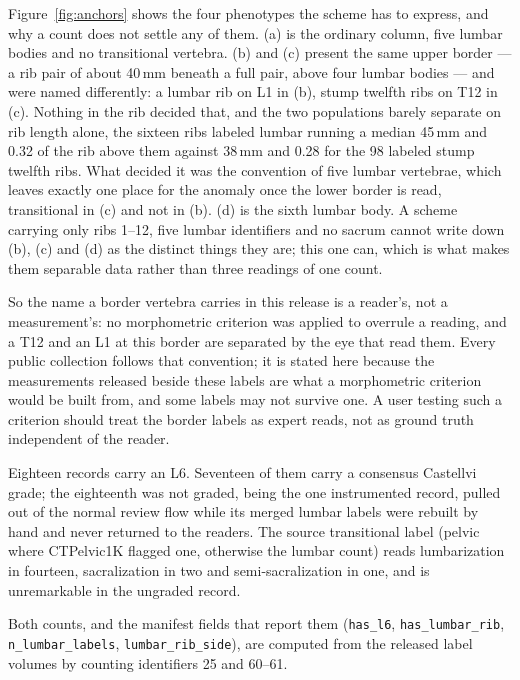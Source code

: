 \documentclass[aapm,mph,amsmath,amssymb,preprint,linenumbers]{revtex4-2}
\begin{document}
Figure~\ref{fig:anchors} shows the four phenotypes the scheme has to express, and why a count
does not settle any of them. (a) is the ordinary column, five lumbar bodies and no transitional
vertebra. (b) and (c) present the same upper border --- a rib pair of about 40\,mm beneath a
full pair, above four lumbar bodies --- and were named differently: a lumbar rib on L1 in (b),
stump twelfth ribs on T12 in (c). Nothing in the rib decided that, and the two populations
barely separate on rib length alone, the sixteen ribs labeled lumbar running a median 45\,mm
and 0.32 of the rib above them against 38\,mm and 0.28 for the 98 labeled stump twelfth ribs.
What decided it was the convention of five lumbar vertebrae, which leaves exactly one place for
the anomaly once the lower border is read, transitional in (c) and not in (b). (d) is the
sixth lumbar body. A scheme carrying only ribs 1--12, five lumbar identifiers and no sacrum
cannot write down (b), (c) and (d) as the distinct things they are; this one can, which is what
makes them separable data rather than three readings of one count.

So the name a border vertebra carries in this release is a reader's, not a measurement's: no
morphometric criterion was applied to overrule a reading, and a T12 and an L1 at this border
are separated by the eye that read them. Every public collection follows that convention; it
is stated here because the measurements released beside these labels are what a morphometric
criterion would be built from, and some labels may not survive one. A user testing such a
criterion should treat the border labels as expert reads, not as ground truth independent of
the reader.

Eighteen records carry an L6. Seventeen of them carry a consensus Castellvi grade;
the eighteenth was not graded, being the one instrumented record, pulled out of the normal
review flow while its merged lumbar labels were rebuilt by hand and never returned to the
readers. The source transitional label (pelvic where CTPelvic1K flagged one, otherwise the lumbar count) reads lumbarization in fourteen, sacralization in two and semi-sacralization in one, and is unremarkable in the ungraded record. \begin{sloppypar} Both counts, and the manifest fields that report them (\texttt{has\_l6},
\texttt{has\_lumbar\_rib}, \texttt{n\_lumbar\_labels}, \texttt{lumbar\_rib\_side}), are
computed from the released label volumes by counting identifiers 25 and 60--61.
\end{sloppypar}
\end{document}
